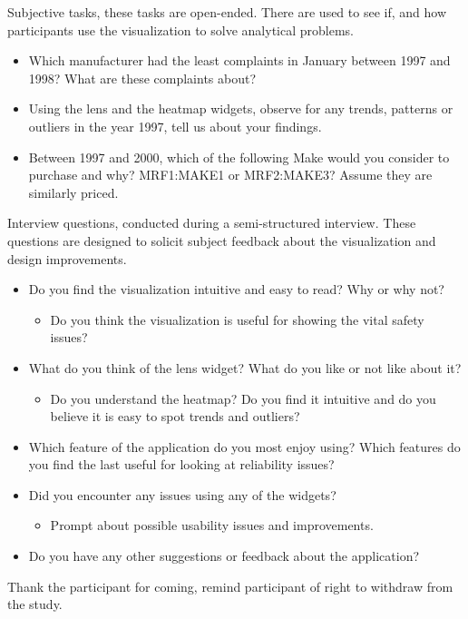\noindent 
Subjective tasks, these tasks are open-ended. There are used to see if, and how
participants use the visualization to solve analytical problems.

\begin{itemize}[noitemsep]
  \item Which manufacturer had the least complaints in January between 1997 and
  1998? What are these complaints about?
  \item Using the lens and the heatmap widgets, observe for any trends, patterns
  or outliers in the year 1997, tell us about your findings.
  \item Between 1997 and 2000, which of the following Make would you consider to
  purchase and why? MRF1:MAKE1 or MRF2:MAKE3? Assume they are similarly
  priced.
\end{itemize}

 
\noindent
Interview questions, conducted during a semi-structured interview. These
questions are designed to solicit subject feedback about the visualization and
design improvements.



\begin{itemize}
  \item Do you find the \threed visualization intuitive and easy to read? Why or
  why not?
  \begin{itemize}
    \item Do you think the visualization is useful for showing the vital safety
    issues?
  \end{itemize}
  
  \item What do you think of the lens widget? What do you like or not like about
  it?
  \begin{itemize}
    \item Do you understand the heatmap? Do you find it intuitive and do you
    believe it is easy to spot trends and outliers?
  \end{itemize}
  
  \item Which feature of the application do you most enjoy using? Which features
  do you find the last useful for looking at reliability issues? 
  
  \item Did you encounter any issues using any of the widgets? 
  \begin{itemize}
    \item  Prompt about possible usability issues and improvements.
  \end{itemize}
  
  \item Do you have any other suggestions or feedback about the application?
\end{itemize}


\noindent
Thank the participant for coming, remind participant of right to withdraw from
the study.
